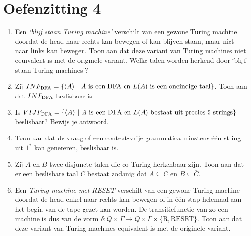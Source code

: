 \documentclass[a4paper]{article}
\begin{document}
\pagestyle{empty}

\section*{Oefenzitting 4}


\begin{enumerate}
\item Een \emph{`blijf staan Turing machine'} verschilt van een gewone Turing machine doordat de head naar rechts kan bewegen of kan blijven staan, maar niet naar links kan bewegen. Toon aan dat deze variant van Turing machines niet equivalent is met de originele variant. Welke talen worden herkend door `blijf staan Turing machines'?
\item Zij $INF_{\rm DFA} = \{ \langle A \rangle \ | \ \text{$A$ is een DFA en $L(A)$ is een oneindige taal} \} $. Toon aan dat $INF_{\rm DFA}$ beslisbaar is.
\item Is $VIJF_{\rm DFA} = \{ \langle A \rangle \ | \ \text{$A$ is een DFA en $L(A)$ bestaat uit precies 5 strings} \} $ beslisbaar? Bewijs je antwoord.
\item Toon aan dat de vraag of een context-vrije grammatica minstens \'e\'en string uit $1^*$ kan genereren, beslisbaar is.
\item Zij $A$ en $B$ twee disjuncte talen die co-Turing-herkenbaar zijn. Toon aan dat er een beslisbare taal $C$ bestaat zodanig dat $A \subseteq C$ en $B \subseteq \overline{C}$. 
\item Een \emph{Turing machine met RESET} verschilt van een gewone Turing machine doordat de head enkel naar rechts kan bewegen of in \'e\'en stap helemaal aan het begin van de tape gezet kan worden. De transitiefunctie van zo een machine is dus van de vorm $\delta : Q \times \Gamma \to Q \times \Gamma \times \{ \text{R}, \text{RESET} \}$. Toon aan dat deze variant van Turing machines equivalent is met de originele variant.

\end{enumerate}
\end{document}
